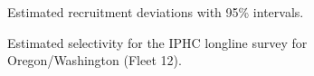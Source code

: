\documentclass[
]{scrartcl}
\begin{document}
\begin{figure}


\caption{\label{fig-recdevs_err}Estimated recruitment deviations with
95\% intervals.}

\end{figure}%

\begin{figure}


\caption{\label{fig-sel12}Estimated selectivity for the IPHC longline
survey for Oregon/Washington (Fleet 12).}

\end{figure}%
\end{document}
